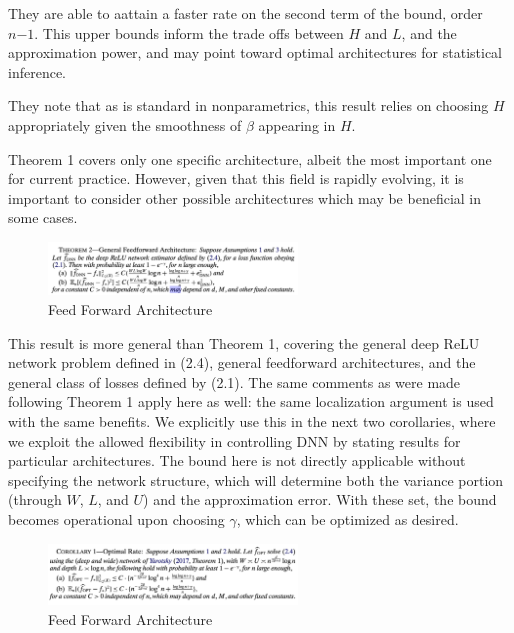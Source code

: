 \documentclass{article}
\begin{document}
They are able to aattain a faster rate on the second term of the bound, order $n{-1}$. This upper bounds inform the trade offs between $H$ and $L$, and the approximation power, and may point toward optimal architectures for statistical inference.

They note that as is standard in nonparametrics, this result relies on choosing $H$ appropriately given the smoothness of $\beta$ appearing in $H$.

Theorem 1 covers only one specific architecture, albeit the most important one for current practice. However, given that this field is rapidly evolving, it is important to consider other possible architectures which may be beneficial in some cases.


\begin{figure}[H]
  \centering
  \includegraphics[width=250px]{draft-photos/dnn-for-estimation/dnn_theorem_2.png}
  \caption{Feed Forward Architecture}
  \label{fig:dnn_theorem_2}
\end{figure}

This result is more general than Theorem 1, covering the general deep ReLU network problem deﬁned in (2.4), general feedforward architectures, and the general class of losses deﬁned by (2.1). The same comments as were made following Theorem 1 apply here as well: the same localization argument is used with the same beneﬁts. We explicitly use this in the next two corollaries, where we exploit the allowed ﬂexibility in controlling DNN by stating results for particular architectures. The bound here is not directly applicable without specifying the network structure, which will determine both the variance portion (through $W$, $L$, and $U$) and the approximation error. With these set, the bound becomes operational upon choosing $\gamma$, which can be optimized as desired.

\begin{figure}[H]
  \centering
  \includegraphics[width=250px]{draft-photos/dnn-for-estimation/dnn_corollary_1.png}
  \caption{Feed Forward Architecture}
  \label{fig:dnn_corollary_1}
\end{figure}
\end{document}
